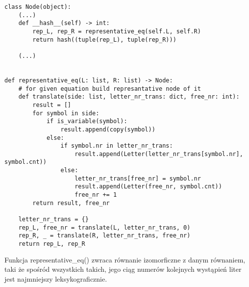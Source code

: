 \documentclass[leqno, 12pt]{article}
\begin{document}
\begin{verbatim}
class Node(object):
    (...)
    def __hash__(self) -> int:
        rep_L, rep_R = representative_eq(self.L, self.R)
        return hash((tuple(rep_L), tuple(rep_R)))

    (...)


def representative_eq(L: list, R: list) -> Node:
    # for given equation build represantative node of it
    def translate(side: list, letter_nr_trans: dict, free_nr: int):
        result = []
        for symbol in side:
            if is_variable(symbol):
                result.append(copy(symbol))
            else:
                if symbol.nr in letter_nr_trans:
                    result.append(Letter(letter_nr_trans[symbol.nr], symbol.cnt))
                else:
                    letter_nr_trans[free_nr] = symbol.nr
                    result.append(Letter(free_nr, symbol.cnt))
                    free_nr += 1
        return result, free_nr

    letter_nr_trans = {}
    rep_L, free_nr = translate(L, letter_nr_trans, 0)
    rep_R, _ = translate(R, letter_nr_trans, free_nr)
    return rep_L, rep_R
\end{verbatim}

Funkcja representative\_eq() zwraca równanie izomorficzne z danym równaniem, taki że spośród wszystkich takich, jego ciąg numerów kolejnych wystąpień liter jest najmniejszy leksykograficznie. 



\end{document}
